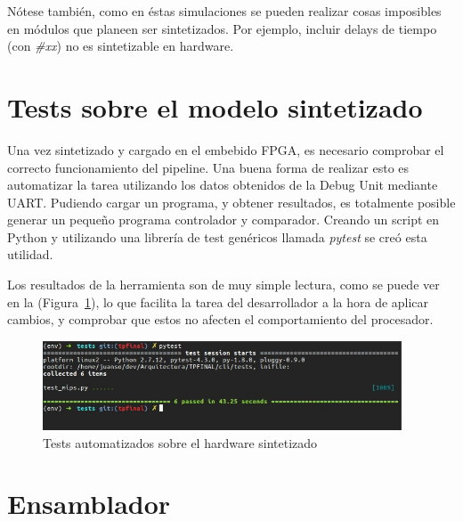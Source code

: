 \documentclass[12pt]{article}
\begin{document}
Nótese también, como en éstas simulaciones se pueden realizar cosas imposibles en módulos que planeen ser sintetizados. Por ejemplo, incluir delays de tiempo (con \textit{\#xx}) no es sintetizable en hardware.

\section{Tests sobre el modelo sintetizado}

Una vez sintetizado y cargado en el embebido FPGA, es necesario comprobar el correcto funcionamiento del pipeline. Una buena forma de realizar esto es automatizar la tarea utilizando los datos obtenidos de la Debug Unit mediante UART. Pudiendo cargar un programa, y obtener resultados, es totalmente posible generar un pequeño programa controlador y comparador. Creando un script en Python y utilizando una librería de test genéricos llamada \textit{pytest} se creó esta utilidad.

Los resultados de la herramienta son de muy simple lectura, como se puede ver en la (Figura~\ref{fig:test}), lo que facilita la tarea del desarrollador a la hora de aplicar cambios, y comprobar que estos no afecten el comportamiento del procesador.

\begin{figure}[ht]
\centering
\hspace*{-1cm}
\includegraphics[width=0.95\textwidth]{imagenes/test.jpeg}
\caption{Tests automatizados sobre el hardware sintetizado}
\label{fig:test}
\end{figure}

\section{Ensamblador}
\end{document}
